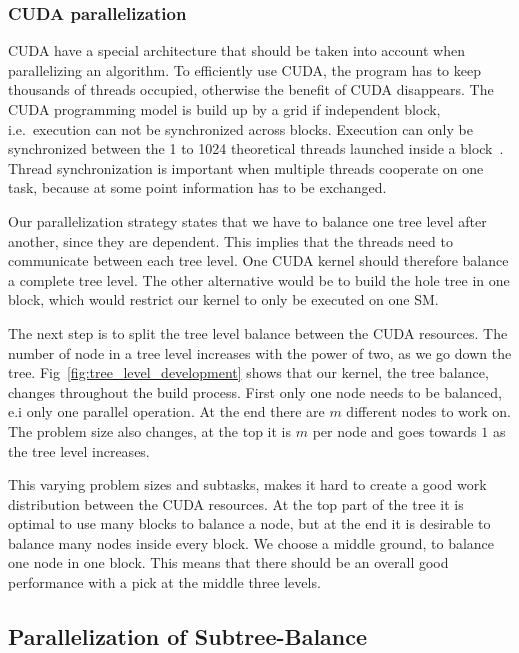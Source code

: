 \subsubsection{CUDA parallelization} %
\label{ssub:divide_work_on_cuda}

CUDA have a special architecture that should be taken into account when parallelizing an algorithm. To efficiently use CUDA, the program has to keep thousands of threads occupied, otherwise the benefit of CUDA disappears. The CUDA programming model is build up by a grid if independent block, i.e.\ execution can not be synchronized across blocks. Execution can only be synchronized between the 1 to 1024 theoretical threads launched inside a block~\cite{cuda_programming_guide}. Thread synchronization is important when multiple threads cooperate on one task, because at some point information has to be exchanged.

Our parallelization strategy states that we have to balance one tree level after another, since they are dependent. This implies that the threads need to communicate between each tree level. One CUDA kernel should therefore balance a complete tree level. The other alternative would be to build the hole tree in one block, which would restrict our kernel to only be executed on one SM\@.

The next step is to split the tree level balance between the CUDA resources. The number of node in a tree level increases with the power of two, as we go down the tree. Fig~\ref{fig:tree_level_development} shows that our kernel, the tree balance, changes throughout the build process. First only one node needs to be balanced, e.i only one parallel operation. At the end there are $m$ different nodes to work on. The problem size also changes, at the top it is $m$ per node and  goes towards $1$ as the tree level increases.

This varying problem sizes and subtasks, makes it hard to create a good work distribution between the CUDA resources. At the top part of the tree it is optimal to use many blocks to balance a node, but at the end it is desirable to balance many nodes inside every block. We choose a middle ground, to balance one node in one block. This means that there should be an overall good performance with a pick at the middle three levels.

\subsection{Parallelization of Subtree-Balance} %
\label{ssub:selecting_a_algorithm}

